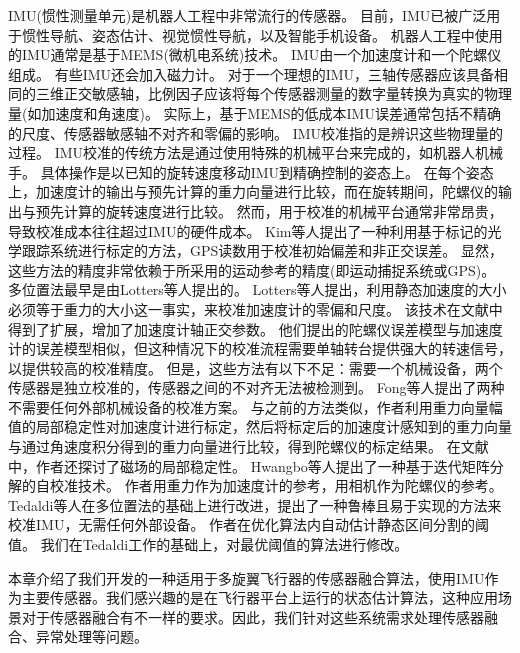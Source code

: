 \documentclass[
  type=master
]{gdutthesis}
\begin{document}
IMU(惯性测量单元)是机器人工程中非常流行的传感器。
目前，IMU已被广泛用于惯性导航\cite{jekeli2012inertial}、姿态估计\cite{mahony2008nonlinear}、视觉惯性导航\cite{baldwin2009inertial}，以及智能手机设备\cite{li2013real}。
机器人工程中使用的IMU通常是基于MEMS(微机电系统)技术。
IMU由一个加速度计和一个陀螺仪组成。
有些IMU还会加入磁力计。
对于一个理想的IMU，三轴传感器应该具备相同的三维正交敏感轴，比例因子应该将每个传感器测量的数字量转换为真实的物理量(如加速度和角速度)。
实际上，基于MEMS的低成本IMU误差通常包括不精确的尺度、传感器敏感轴不对齐和零偏的影响。
IMU校准指的是辨识这些物理量的过程。
IMU校准的传统方法是通过使用特殊的机械平台来完成的，如机器人机械手。
具体操作是以已知的旋转速度移动IMU到精确控制的姿态上\cite{hall2000case}。
在每个姿态上，加速度计的输出与预先计算的重力向量进行比较，而在旋转期间，陀螺仪的输出与预先计算的旋转速度进行比较。
然而，用于校准的机械平台通常非常昂贵，导致校准成本往往超过IMU的硬件成本。
Kim等人提出了一种利用基于标记的光学跟踪系统进行标定的方法，GPS读数用于校准初始偏差和非正交误差\cite{kim2004initial}。
显然，这些方法的精度非常依赖于所采用的运动参考的精度(即运动捕捉系统或GPS)。
多位置法最早是由Lotters等人提出的\cite{lotters1998procedure}。
Lotters等人提出，利用静态加速度的大小必须等于重力的大小这一事实，来校准加速度计的零偏和尺度。
该技术在文献\cite{syed2007new}中得到了扩展，增加了加速度计轴正交参数。
他们提出的陀螺仪误差模型与加速度计的误差模型相似，但这种情况下的校准流程需要单轴转台提供强大的转速信号，以提供较高的校准精度。
但是，这些方法有以下不足：需要一个机械设备，两个传感器是独立校准的，传感器之间的不对齐无法被检测到。
Fong等人提出了两种不需要任何外部机械设备的校准方案\cite{fong2008methods}。
与之前的方法类似，作者利用重力向量幅值的局部稳定性对加速度计进行标定，然后将标定后的加速度计感知到的重力向量与通过角速度积分得到的重力向量进行比较，得到陀螺仪的标定结果。
在文献\cite{cheuk2012automatic}中，作者还探讨了磁场的局部稳定性。
Hwangbo等人提出了一种基于迭代矩阵分解的自校准技术\cite{hwangbo2013imu}。
作者用重力作为加速度计的参考，用相机作为陀螺仪的参考。
Tedaldi等人在多位置法的基础上进行改进，提出了一种鲁棒且易于实现的方法来校准IMU，无需任何外部设备\cite{tedaldi2014robust}。
作者在优化算法内自动估计静态区间分割的阈值。
我们在Tedaldi工作的基础上，对最优阈值的算法进行修改。


本章介绍了我们开发的一种适用于多旋翼飞行器的传感器融合算法，使用IMU作为主要传感器。我们感兴趣的是在飞行器平台上运行的状态估计算法，这种应用场景对于传感器融合有不一样的要求。因此，我们针对这些系统需求处理传感器融合、异常处理等问题。
\end{document}
